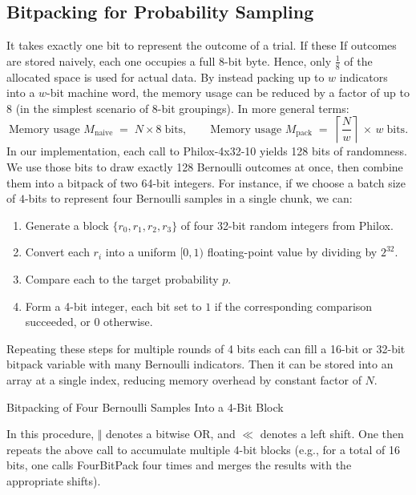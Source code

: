 \subsection{Bitpacking for Probability Sampling}
It takes exactly one bit to represent the outcome of a trial. If these If outcomes are stored naively, each one occupies a full 8-bit byte. Hence, only \( \tfrac{1}{8} \) of the allocated space is used for actual data. By instead packing up to \(w\) indicators into a \(w\)-bit machine word, the memory usage can be reduced by a factor of up to \(8\) (in the simplest scenario of 8-bit groupings). In more general terms:
\[
  \text{Memory usage }M_{\text{naive}}
  \;=\;
  N \times 8\;\text{bits},
  \qquad
  \text{Memory usage }M_{\text{pack}}
  \;=\;
  \left\lceil\frac{N}{w}\right\rceil \,\times\,w\;\text{bits}.
\]
In our implementation, each call to Philox-4x32-10 yields 128 bits of randomness. We use those bits to draw exactly 128 Bernoulli outcomes at once, then combine them into a \(\mathrm{bitpack}\) of two 64-bit integers. For instance, if we choose a batch size of \(4\)-bits to represent four Bernoulli samples in a single chunk, we can:

\begin{enumerate}
    \item Generate a block \(\{r_0, r_1, r_2, r_3\}\) of four 32-bit random integers from Philox.
    \item Convert each \(r_i\) into a uniform \([0,1)\) floating-point value by dividing by \(2^{32}\).
    \item Compare each to the target probability \(p\).
    \item Form a 4-bit integer, each bit set to \(1\) if the corresponding comparison succeeded, or \(0\) otherwise.
\end{enumerate}

\noindent Repeating these steps for multiple rounds of 4 bits each can fill a 16-bit or 32-bit \(\mathrm{bitpack}\) variable with many Bernoulli indicators. Then it can be stored into an array at a single index, reducing memory overhead by constant factor of $N$. 


\begin{algorithm}[H]
\caption{Bitpacking of Four Bernoulli Samples Into a 4-Bit Block}


\Fn{\FMain{\(p, (r_0, r_1, r_2, r_3)\)}}{
    $\mathrm{bits} \gets 0$\;
    \For{$i \gets 0$ \KwTo $3$}{
        $u_i \gets \frac{r_i}{2^{32}} \;\; \in [0,1)$\;
        $b_i \gets \begin{cases}
            1, & \text{if }u_i < p\\
            0, & \text{else}
        \end{cases}$\;
        $\mathrm{bits} \gets \mathrm{bits} \;\;\Vert\;\; (b_i \ll i)$ \tcp*[r]{Set bit \(i\) to \(b_i\)}
    }
    \KwRet $\mathrm{bits}$\;
}
\end{algorithm}

\noindent In this procedure, \(\Vert\) denotes a bitwise OR, and \(\ll\) denotes a left shift. One then repeats the above call to accumulate multiple 4-bit blocks (e.g., for a total of 16 bits, one calls FourBitPack four times and merges the results with the appropriate shifts).